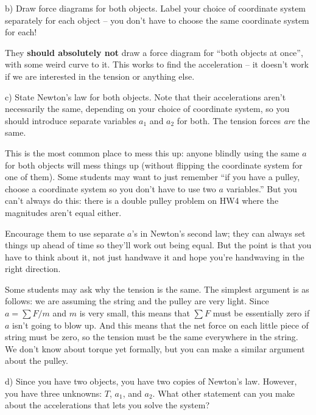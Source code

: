 \documentclass[12pt]{article}
\begin{document}
		
		b) Draw force diagrams for both objects. Label your choice of coordinate system separately for each object -- you don't have to choose the same coordinate system for each!
		
		
		{\color{Red}
			They {\bf should absolutely not} draw a force diagram for ``both objects at once'', with some weird curve to it. This works to find the acceleration -- it doesn't work if we are interested in the tension or anything else.}
		
		
		c) State Newton's law for both objects. Note that their accelerations aren't necessarily the same, depending on your choice of coordinate system, so you should introduce separate variables $a_1$ and $a_2$ for both. The tension forces
		{\it are} the same.
		
				{\color{Red}
					
					This is the most common place to mess this up: anyone blindly using the same $a$ for both objects will mess things up (without flipping the coordinate system for one of them). Some students may want to just remember ``if you have a pulley, choose a coordinate system so you don't have to use two $a$ variables.'' But you can't always do this: there is a double pulley problem on HW4 where the magnitudes aren't equal either.
					
					Encourage them to use separate $a$'s in Newton's second law; they can always set things up ahead of time so they'll work out being equal. But the point is that you have to think about it, not just handwave it and hope you're handwaving in the right direction.
					
					
					
					Some students may ask why the tension is the same. The simplest argument is as follows: we are assuming the string and the pulley are very light. Since $a = \sum F / m$ and $m$ is very small, this means that $\sum F$ must be essentially zero if $a$ isn't going to blow up. And this means that the net force on each little piece of string must be zero, so the tension must be the same everywhere in the string. We don't know about torque yet formally, but you can make a similar argument about the pulley.
				
			
		
	}
				
		
		d) Since you have two objects, you have two copies of Newton's law. However, you have three unknowns: $T$, $a_1$, and $a_2$. What other statement can you make about the accelerations that lets you solve the system?
		
\end{document}
